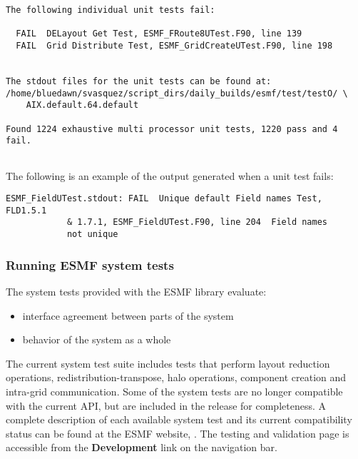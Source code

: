 \begin{verbatim}
The following individual unit tests fail:

  FAIL  DELayout Get Test, ESMF_FRoute8UTest.F90, line 139                                                                                                                                                                                                       
  FAIL  Grid Distribute Test, ESMF_GridCreateUTest.F90, line 198                                                                                                                                                                                                 


The stdout files for the unit tests can be found at:
/home/bluedawn/svasquez/script_dirs/daily_builds/esmf/test/testO/ \
	AIX.default.64.default

Found 1224 exhaustive multi processor unit tests, 1220 pass and 4 fail.


\end{verbatim}

The following is an example of the output generated when a unit test fails:
\begin{verbatim}
ESMF_FieldUTest.stdout: FAIL  Unique default Field names Test, FLD1.5.1 
			& 1.7.1, ESMF_FieldUTest.F90, line 204  Field names 
			not unique
\end{verbatim}

\subsubsection{Running ESMF system tests}
\label{SystemTestDescription}

The system tests provided with the ESMF library evaluate:
\begin{itemize}
\item interface agreement between parts of the system
\item behavior of the system as a whole
\end{itemize}

The current system test suite includes tests that perform layout
reduction operations, redistribution-transpose, halo operations,
component creation and intra-grid communication.  Some of the system
tests are no longer compatible with the current API, but are included
in the release for completeness.  A complete description of each
available system test and its current compatibility status can be
found at the ESMF website,
.  
The testing
and validation page is accessible from the {\bf Development} 
link on the navigation bar.

